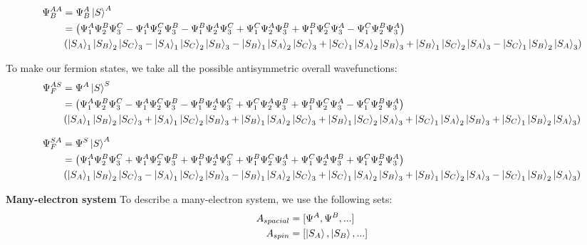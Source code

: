 \documentclass[10pt]{article} %
\begin{document}
\begin{align*}
  \Psi_B^{AA} &= \Psi_B^A\ket{S}^A\\
  &= \left(\Psi_1^A\Psi_2^B\Psi_3^C - \Psi_1^A\Psi_2^C\Psi_3^B
  - \Psi_1^B\Psi_2^A\Psi_3^C + \Psi_1^C\Psi_2^A\Psi_3^B
  + \Psi_1^B\Psi_2^C\Psi_3^A - \Psi_1^C\Psi_2^B\Psi_3^A\right)\\
  &\left(\ket{S_A}_1\ket{S_B}_2\ket{S_C}_3 - \ket{S_A}_1\ket{S_C}_2\ket{S_B}_3
  - \ket{S_B}_1\ket{S_A}_2\ket{S_C}_3 + \ket{S_C}_1\ket{S_A}_2\ket{S_B}_3
  + \ket{S_B}_1\ket{S_C}_2\ket{S_A}_3 - \ket{S_C}_1\ket{S_B}_2\ket{S_A}_3\right)\\
\end{align*}

To make our fermion states, we take all the possible antisymmetric overall wavefunctions:\\

\begin{align*}
  \Psi_F^{AS} &= \Psi^A\ket{S}^S\\
  &= \left(\Psi_1^A\Psi_2^B\Psi_3^C - \Psi_1^A\Psi_2^C\Psi_3^B
  - \Psi_1^B\Psi_2^A\Psi_3^C + \Psi_1^C\Psi_2^A\Psi_3^B
  + \Psi_1^B\Psi_2^C\Psi_3^A - \Psi_1^C\Psi_2^B\Psi_3^A\right)\\
  &\left(\ket{S_A}_1\ket{S_B}_2\ket{S_C}_3 + \ket{S_A}_1\ket{S_C}_2\ket{S_B}_3
  + \ket{S_B}_1\ket{S_A}_2\ket{S_C}_3 + \ket{S_B}_1\ket{S_C}_2\ket{S_A}_3
  + \ket{S_C}_1\ket{S_A}_2\ket{S_B}_3 + \ket{S_C}_1\ket{S_B}_2\ket{S_A}_3\right)\\
\end{align*}

\begin{align*}
  \Psi_F^{SA} &= \Psi^S\ket{S}^A\\
  &= \left(\Psi_1^A\Psi_2^B\Psi_3^C + \Psi_1^A\Psi_2^C\Psi_3^B
  + \Psi_1^B\Psi_2^A\Psi_3^C + \Psi_1^B\Psi_2^C\Psi_3^A
  + \Psi_1^C\Psi_2^A\Psi_3^B + \Psi_1^C\Psi_2^B\Psi_3^A\right)\\
  &\left(\ket{S_A}_1\ket{S_B}_2\ket{S_C}_3 - \ket{S_A}_1\ket{S_C}_2\ket{S_B}_3
  - \ket{S_B}_1\ket{S_A}_2\ket{S_C}_3 + \ket{S_C}_1\ket{S_A}_2\ket{S_B}_3
  + \ket{S_B}_1\ket{S_C}_2\ket{S_A}_3 - \ket{S_C}_1\ket{S_B}_2\ket{S_A}_3\right)\\
\end{align*}

\textbf{Many-electron system}
To describe a many-electron system, we use the following sets:\\

\begin{align*}
  A_{spacial} &= [\Psi^A, \Psi^B, ...]\\
  A_{spin} &= [\ket{S_A}, \ket{S_B}, ...]\\
\end{align*}
\end{document}
